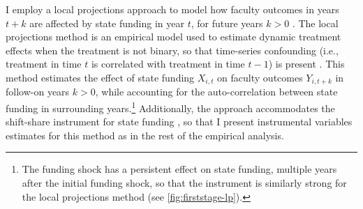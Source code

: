 I employ a local projections approach to model how faculty outcomes in years $t+k$ are affected by state funding in year $t$, for future years $k > 0$ \citep{jorda2005}.
The local projections method is an empirical model used to estimate dynamic treatment effects when the treatment is not binary, so that time-series confounding (i.e., treatment in time $t$ is correlated with treatment in time $t-1$) is present \citep{montiel2021local}.
This method estimates the effect of state funding $X_{i,t}$ on faculty outcomes $Y_{i, t+ k}$ in follow-on years $k > 0$, while accounting for the auto-correlation between state funding in surrounding years.\footnote{
    The funding shock has a persistent effect on state funding, multiple years after the initial funding shock, so that the instrument is similarly strong for the local projections method (see \autoref{fig:firststage-lp}).
}
Additionally, the approach accommodates the shift-share instrument for state funding \citep{olea2021inference}, so that I present instrumental variables estimates for this method as in the rest of the empirical analysis.
